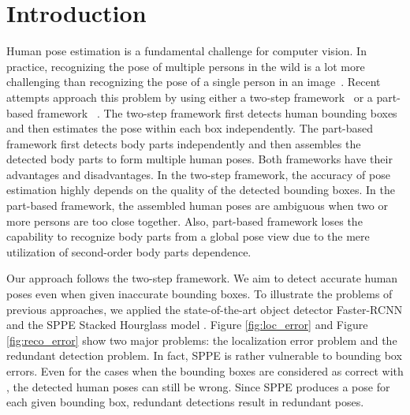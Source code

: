 \documentclass[10pt,twocolumn,letterpaper]{article}
\begin{document}
\section{Introduction}
\label{sec:Introduction}
Human pose estimation is a fundamental challenge for computer vision. In practice, recognizing the pose of multiple persons in the wild is a lot more challenging than recognizing the pose of a single person in an image~\cite{sapp2010cascaded,sun2012conditional,ladicky2013human,newell2016stacked,wei2016convolutional}. Recent attempts approach this problem by using either a two-step framework~\cite{pishchulin2012articulated,gkioxari2014using}  or
a part-based framework ~\cite{chen2015parsing,pishchulin16cvpr,insafutdinov16ariv}.
The two-step framework first detects human bounding boxes and then estimates the pose within each box independently. The part-based framework first detects body parts independently and then assembles the detected body parts to form multiple human poses. Both frameworks have their advantages and disadvantages. In the two-step framework, the accuracy of pose estimation highly depends on the quality of the detected bounding boxes. In the part-based framework, the assembled human poses are ambiguous when two or more persons are too close together. Also, part-based framework loses the capability to recognize body parts from a global pose view due to the mere utilization of second-order body parts dependence.

Our approach follows the two-step framework. We aim to detect accurate human poses even when given inaccurate bounding boxes. To illustrate the problems of previous approaches, we applied the state-of-the-art object detector Faster-RCNN \cite{ren2015faster} and the SPPE Stacked Hourglass model \cite{newell2016stacked}. Figure \ref{fig:loc_error} and Figure \ref{fig:reco_error} show two major problems: the localization error problem and the redundant detection problem. In fact, SPPE is rather vulnerable to bounding box errors. Even for the cases when the bounding boxes are considered as correct with , the detected human poses can still be wrong. Since SPPE produces a pose for each given bounding box, redundant detections result in redundant poses.
\end{document}
